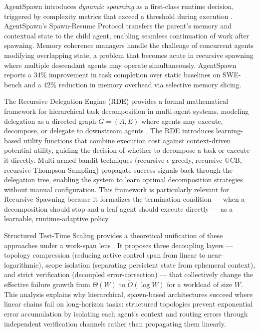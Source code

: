 AgentSpawn introduces \emph{dynamic spawning} as a first-class runtime decision, triggered by complexity metrics that exceed a threshold during execution \citep{zhou2025agentspawn}. AgentSpawn's Spawn-Resume Protocol transfers the parent's memory and contextual state to the child agent, enabling seamless continuation of work after spawning. Memory coherence managers handle the challenge of concurrent agents modifying overlapping state, a problem that becomes acute in recursive spawning where multiple descendant agents may operate simultaneously. AgentSpawn reports a 34\% improvement in task completion over static baselines on SWE-bench and a 42\% reduction in memory overhead via selective memory slicing.

The Recursive Delegation Engine (RDE) provides a formal mathematical framework for hierarchical task decomposition in multi-agent systems, modeling delegation as a directed graph $G = (A, E)$ where agents may execute, decompose, or delegate to downstream agents \citep{emergentmind2025rde}. The RDE introduces learning-based utility functions that combine execution cost against context-driven potential utility, guiding the decision of whether to decompose a task or execute it directly. Multi-armed bandit techniques (recursive $\epsilon$-greedy, recursive UCB, recursive Thompson Sampling) propagate success signals back through the delegation tree, enabling the system to learn optimal decomposition strategies without manual configuration. This framework is particularly relevant for Recursive Spawning because it formalizes the termination condition — when a decomposition should stop and a leaf agent should execute directly — as a learnable, runtime-adaptive policy.

Structured Test-Time Scaling provides a theoretical unification of these approaches under a work-span lens \citep{tu2026structured}. It proposes three decoupling layers — topology compression (reducing active control span from linear to near-logarithmic), scope isolation (separating persistent state from ephemeral context), and strict verification (decoupled error-correction) — that collectively change the effective failure growth from $\Theta(W)$ to $\tilde{O}(\log W)$ for a workload of size $W$. This analysis explains why hierarchical, spawn-based architectures succeed where linear chains fail on long-horizon tasks: structured topologies prevent exponential error accumulation by isolating each agent's context and routing errors through independent verification channels rather than propagating them linearly.

